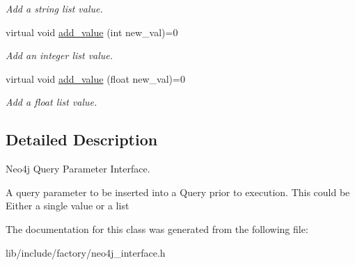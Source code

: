 \begin{DoxyCompactItemize}
\begin{DoxyCompactList}\small\item\em Add a string list value. \end{DoxyCompactList}\item 
\hypertarget{classNeo4jQueryParameterInterface_a2695fcfd064dbe3a70da0b7dd86f6a06}{virtual void \hyperlink{classNeo4jQueryParameterInterface_a2695fcfd064dbe3a70da0b7dd86f6a06}{add\-\_\-value} (int new\-\_\-val)=0}\label{classNeo4jQueryParameterInterface_a2695fcfd064dbe3a70da0b7dd86f6a06}

\begin{DoxyCompactList}\small\item\em Add an integer list value. \end{DoxyCompactList}\item 
\hypertarget{classNeo4jQueryParameterInterface_a57517c3cd83d48ab5e8e0e4a68e59418}{virtual void \hyperlink{classNeo4jQueryParameterInterface_a57517c3cd83d48ab5e8e0e4a68e59418}{add\-\_\-value} (float new\-\_\-val)=0}\label{classNeo4jQueryParameterInterface_a57517c3cd83d48ab5e8e0e4a68e59418}

\begin{DoxyCompactList}\small\item\em Add a float list value. \end{DoxyCompactList}\end{DoxyCompactItemize}


\subsection{Detailed Description}
Neo4j Query Parameter Interface. 

A query parameter to be inserted into a Query prior to execution. This could be Either a single value or a list 

The documentation for this class was generated from the following file\-:\begin{DoxyCompactItemize}
\item 
lib/include/factory/neo4j\-\_\-interface.\-h\end{DoxyCompactItemize}
